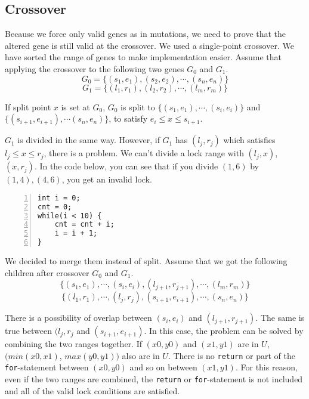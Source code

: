 \subsection{Crossover}

Because we force only valid genes as in mutations, we need to prove that the altered gene is still valid at the crossover. We used a single-point crossover. We have sorted the range of genes to make implementation easier. Assume that applying the crossover to the following two genes $G_{0}$ and $G_{1}$.
\[G_{0} = \{(s_{1}, e_{1}), (s_{2}, e_{2}), \cdots , (s_{n}, e_{n}) \}\]
\[G_{1} = \{(l_{1}, r_{1}), (l_{2}, r_{2}), \cdots , (l_{m}, r_{m}) \}\] 

If split point $x$ is set at $G_{0}$, $G_{0}$ is split to $\{(s_{1}, e_{1}), \cdots, (s_{i}, e_{i})\}$ and $\{(s_{i+1}, e_{i+1}), \cdots (s_{n}, e_{n})\}$, to satisfy $e_{i} \leq x \leq s_{i+1}$.

$G_ {1}$ is divided in the same way. However, if $G_{1}$ has $(l_{j}, r_{j})$ which satisfies $l_{j} \leq x \leq r_{j}$, there is a problem. We can't divide a lock range with $ (l_ {j}, x) $, $ (x, r_ {j}) $. In the code below, you can see that if you divide $ (1, 6) $ by $ (1,4), (4, 6) $, you get an invalid lock.

\begin{lstlisting}[frame=tb, xleftmargin=2em, framexleftmargin=1.5em, numbers=left]
int i = 0;
cnt = 0;
while(i < 10) {
    cnt = cnt + i;
    i = i + 1;
}
\end{lstlisting}

We decided to merge them instead of split. Assume that we got the following children after crossover $G_{0}$ and $G_{1}$.
\[\{ (s_{1}, e_{1}),\cdots,(s_{i}, e_{i}), (l_{j+1}, r_{j+1}), \cdots, (l_{m}, r_{m}) \}\]
\[\{ (l_{1}, r_{1}),\cdots,(l_{j},r_{j}), (s_{i+1}, e_{i+1}), \cdots, (s_{n}, e_{n}) \}\]

There is a possibility of overlap between $(s_{i}, e_{i})$ and $(l_{j+1}, r_{j+1})$. The same is true between $(l_{j}, r_{j}$ and $(s_{i+1}, e_{i+1})$. In this case, the problem can be solved by combining the two ranges together. If $(x0,y0)$ and $(x1,y1)$ are in $U$, $(min(x0,x1)$, $max(y0,y1))$ also are in $U$. There is no \verb|return| or part of the \verb|for|-statement between $(x0,y0)$ and so on between $(x1,y1)$. For this reason, even if the two ranges are combined, the \verb|return| or \verb|for|-statement is not included and all of the valid lock conditions are satisfied.